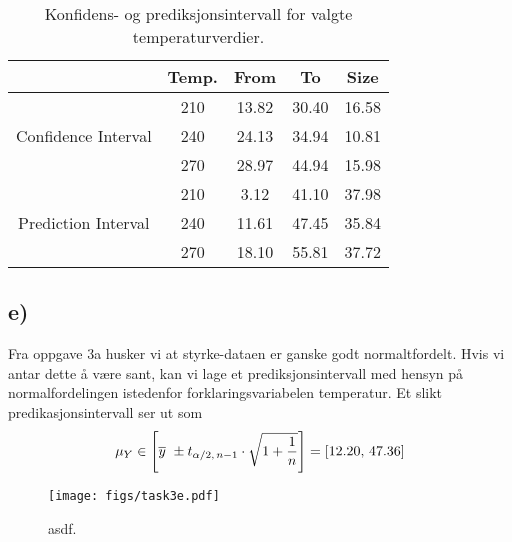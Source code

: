 \documentclass[12p,a4paper]{article}
\renewcommand{\bar}{\overline}
\begin{document}
\begin{table}[H]
    \begin{center}
        \begin{tabular}{c |c | c  c  c}
                                                &    Temp.  & From & To & Size \\
                                                        \hline
        \multirow{3}{*}{Confidence Interval}    &    210    & 13.82 & 30.40 & 16.58 \\
                                                        \cline{2-5}
                                                &    240    & 24.13 & 34.94 & 10.81 \\
                                                        \cline{2-5}
                                                &    270    & 28.97 & 44.94 & 15.98 \\
                                                        \hline
        \multirow{3}{*}{Prediction Interval}    &    210    & 3.12 & 41.10 & 37.98 \\
                                                        \cline{2-5}
                                                &    240    & 11.61 & 47.45 & 35.84 \\
                                                        \cline{2-5}
                                                &    270    & 18.10 & 55.81 & 37.72 
        \end{tabular}

        \caption{Konfidens- og prediksjonsintervall for valgte temperaturverdier.}
        \label{table:1}
    \end{center}
\end{table}



\subsection*{e)}
Fra oppgave 3a husker vi at styrke-dataen er ganske godt normaltfordelt. Hvis vi antar dette å være sant, kan vi lage et prediksjonsintervall med hensyn på normalfordelingen istedenfor forklaringsvariabelen temperatur. Et slikt predikasjonsintervall ser ut som
\begin{align*}
    \mu_{Y} \in \qty[\bar{y} \pm t_{\alpha/2,\, n-1}\cdot \sqrt{1 + \frac{1}{n}}] = \qty[12.20,\, 47.36]
\end{align*}


\begin{figure}[H]
    \centering
    \texttt{[image: figs/task3e.pdf]}
    \caption{asdf.}
    \label{fig:6}
\end{figure}
\end{document}
